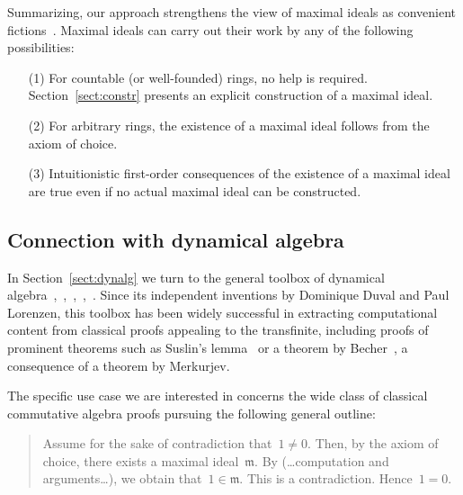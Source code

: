 \documentclass[com,11pt,crcready]{iosart2x}
\theoremstyle{definition}
\theoremstyle{plain}
\theoremstyle{remark}
\newcommand{\mmm}{\mathfrak{m}}
\renewcommand{\_}{\mathpunct{.}\,}
\begin{document}
Summarizing, our approach strengthens the view of maximal ideals as convenient
fictions~\cite[Section~1]{schuster-wessel:krull}. Maximal ideals can carry out
their work by any of the following possibilities:
\begin{enumerate}
\item[(1)] For countable (or well-founded) rings, no help is required.
Section~\ref{sect:constr} presents an explicit construction of a maximal ideal.
\item[(2)] For arbitrary rings, the existence of a maximal ideal follows from the
axiom of choice.
\item[(3)] Intuitionistic first-order consequences of the existence of a maximal
ideal are true even if no actual maximal ideal can be constructed.
\end{enumerate}


\subsection*{Connection with dynamical algebra}

In Section~\ref{sect:dynalg} we turn to the general toolbox of dynamical
algebra~\cite[Section~XV.6]{lombardi-quitte:constructive-algebra},~\cite{coquand-lombardi-roy:dynamicalmethod},~\cite{yengui:constructive},~\cite{duval:about},~\cite{neuwirth:lorenzen}. Since its
independent inventions by Dominique Duval and Paul
Lorenzen, this toolbox has been widely
successful in extracting computational content from classical proofs
appealing to the transfinite, including proofs of prominent theorems such as
Suslin's lemma~\cite{suslin:structure,yengui:maximal} or a theorem by
Becher~\cite{becher:csa}, a consequence of a theorem by Merkurjev.

The specific use case we are interested in concerns the wide class of classical
commutative algebra proofs pursuing the following general outline:
\begin{quote}\small Assume for the sake of contradiction that~$1 \neq 0$. Then, by the
axiom of choice, there exists a maximal ideal~$\mmm$. By (\ldots computation
and arguments\ldots\!), we obtain that~$1 \in \mmm$. This is a contradiction.
Hence~$1 = 0$.\end{quote}
\end{document}
